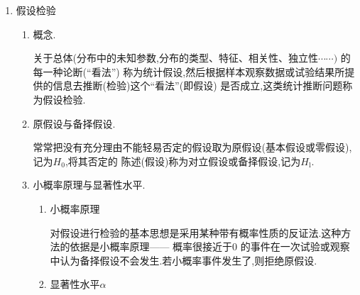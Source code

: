 \begin{enumerate}
\begin{enumerate}
            \end{enumerate}
      \item 假设检验
            \begin{enumerate}
                  \item 概念.

                        关于总体(分布中的未知参数,分布的类型、特征、相关性、独立性$\cdots\cdots)$ 的每一种论断(“看法”) 称为统计假设,然后根据样本观察数据或试验结果所提供的信息去推断(检验)这个“看法”(即假设) 是否成立,这类统计推断问题称为假设检验.
                  \item 原假设与备择假设.

                        常常把没有充分理由不能轻易否定的假设取为原假设(基本假设或零假设),记为$H_{0}$,将其否定的
                        陈述(假设)称为对立假设或备择假设,记为$H_{\mathrm{l}}.$
                  \item 小概率原理与显著性水平.
                        \begin{enumerate}
                              \item 小概率原理

                                    对假设进行检验的基本思想是采用某种带有概率性质的反证法.这种方法的依据是小概率原理—— 概率很接近于0 的事件在一次试验或观察中认为备择假设不会发生.若小概率事件发生了,则拒绝原假设.
                              \item 显著性水平$\alpha$


\end{enumerate}
\end{enumerate}
\end{enumerate}
